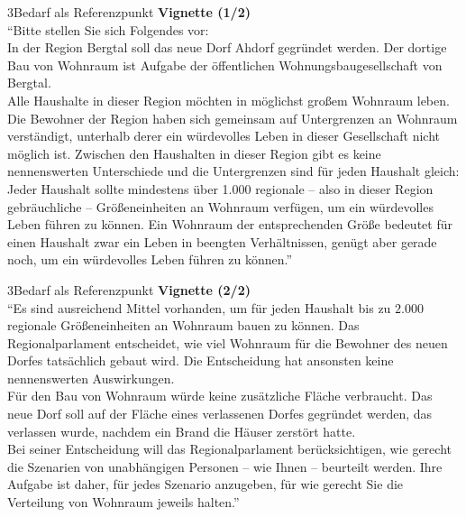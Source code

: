 \documentclass[xcolor=table,9pt,aspectratio=169]{beamer}
\begin{document}
\begin{frame}{\vspace*{10mm}3\hspace*{1em}Bedarf als Referenzpunkt}
\textbf{Vignette (1/2)}\\
\medskip
\enquote{Bitte stellen Sie sich Folgendes vor:\\
\medskip
In der Region Bergtal soll das neue Dorf Ahdorf gegründet werden. Der dortige Bau von Wohnraum ist Aufgabe der öffentlichen Wohnungsbaugesellschaft von Bergtal.\\
\medskip
Alle Haushalte in dieser Region möchten in möglichst großem Wohnraum leben. \textcolor{blue1}{Die Bewohner der Region haben sich gemeinsam auf Untergrenzen an Wohnraum verständigt, unterhalb derer ein würdevolles Leben in dieser Gesellschaft nicht möglich ist. Zwischen den Haushalten in dieser Region gibt es keine nennenswerten Unterschiede und die Untergrenzen sind für jeden Haushalt gleich: Jeder Haushalt sollte mindestens über 1.000 regionale -- also in dieser Region gebräuchliche -- Größeneinheiten an Wohnraum verfügen, um ein würdevolles Leben führen zu können. Ein Wohnraum der entsprechenden Größe bedeutet für einen Haushalt zwar ein Leben in beengten Verhältnissen, genügt aber gerade noch, um ein würdevolles Leben führen zu können.}}
\end{frame}


\begin{frame}{\vspace*{10mm}3\hspace*{1em}Bedarf als Referenzpunkt}
\textbf{Vignette (2/2)}\\
\medskip
\enquote{Es sind ausreichend Mittel vorhanden, um für jeden Haushalt bis zu $2.000$ regionale Größeneinheiten an Wohnraum bauen zu können. Das Regionalparlament entscheidet, wie viel Wohnraum für die Bewohner des neuen Dorfes tatsächlich gebaut wird. Die Entscheidung hat ansonsten keine nennenswerten Auswirkungen.\\
\medskip
Für den Bau von Wohnraum würde keine zusätzliche Fläche verbraucht. Das neue Dorf soll auf der Fläche eines verlassenen Dorfes gegründet werden, das verlassen wurde, nachdem ein Brand die Häuser zerstört hatte.\\
\medskip
Bei seiner Entscheidung will das Regionalparlament berücksichtigen, wie gerecht die Szenarien von unabhängigen Personen -- wie Ihnen -- beurteilt werden. Ihre Aufgabe ist daher, für jedes Szenario anzugeben, für wie gerecht Sie die Verteilung von Wohnraum jeweils halten.}
\end{frame}
\end{document}
